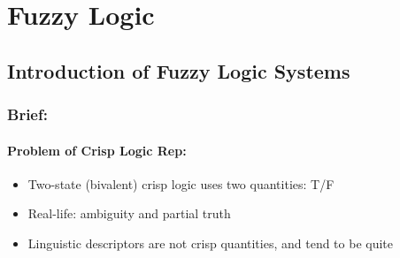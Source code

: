 \documentclass{tron}
\begin{document}
\newpage
\chapter{Fuzzy Logic}
\section{Introduction of Fuzzy Logic Systems}
\subsection{Brief:}
\subsubsection{Problem of Crisp Logic Rep:}
\begin{itemize}
	\item Two-state (bivalent) crisp logic uses two quantities: T/F
	\item Real-life: ambiguity and partial truth
	\item Linguistic descriptors are not crisp quantities, and tend to be quite 
\end{itemize}

\end{document}
